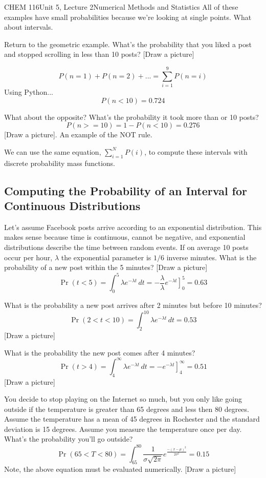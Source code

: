 \documentclass{article}
\begin{document}
\begin{tdoc}{CHEM 116}{Unit 5, Lecture 2}{Numerical Methods and Statistics}
 All of these examples have small probabilities because we're looking
 at single points. What about intervals.

Return to the geometric example. What's the probability that you liked
a post and stopped scrolling in less than 10 posts? [Draw a picture]

\[
P(n = 1) + P(n = 2) + ... = \sum_{i=1}^{9} P(n = i)
\]
Using Python...
\[
P(n < 10) = 0.724
\]

What about the opposite? What's the probability it took more than or
10 posts?
\[
P(n >= 10) = 1 - P(n < 10) = 0.276
\]
[Draw a picture]. An example of the NOT rule.

We can use the same equation, $\sum_{i=1}^N P(i)$, to compute these
intervals with discrete probability mass functions.

\subsection{Computing the Probability of an Interval for Continuous Distributions}

Let's assume Facebook posts arrive according to an exponential
distribution. This makes sense because time is continuous, cannot be
negative, and exponential distributions describe the time between
random events. If on average 10 posts occur per hour, $\lambda$ the
exponential parameter is $1/6$ inverse minutes. What is the probability of a
new post within the 5 minutes? [Draw a picture]
\[
\Pr(t < 5) = \int_0^{5} \lambda e^{-\lambda t}\,dt = -\frac{\lambda}{\lambda}\left.e^{-\lambda t}\right]_0^{5} = 0.63
\]

What is the probability a new post arrives after 2 minutes but before 10 minutes?
\[
\Pr(2 < t < 10) = \int_{2}^{10} \lambda e^{-\lambda t}\,dt  = 0.53
\]
[Draw a picture]

What is the probability the new post comes after 4 minutes?
\[
\Pr(t > 4) = \int_4^{\infty}  \lambda e^{-\lambda t}\,dt = \left.-e^{-\lambda t}\right]_4^{\infty} = 0.51
\]
[Draw a picture]

You decide to stop playing on the Internet so much, but you only like
going outside if the temperature is greater than 65 degrees and less
then 80 degrees. Assume the temperature has a mean of 45 degrees in
Rochester and the standard deviation is 15 degrees. Assume you measure
the temperature once per day. What's the probability you'll go outside?
\[
\Pr(65 < T < 80) = \int_{65}^{80} \frac{1}{\sigma\sqrt{2\pi}}e^{\frac{-(x - \mu)^2}{2\sigma ^2}} = 0.15
\]
Note, the above equation must be evaluated numerically. [Draw a
  picture]


\end{tdoc}
\end{document}

